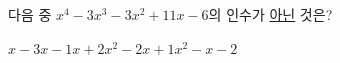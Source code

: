 다음 중 $x^4-3x^3-3x^2+11x-6$의 인수가 \underline{아닌} 것은?
\begin{choices32}{$x-3$}{$x-1$}{$x+2$}{$x^2-2x+1$}{$x^2-x-2$}\end{choices32}
